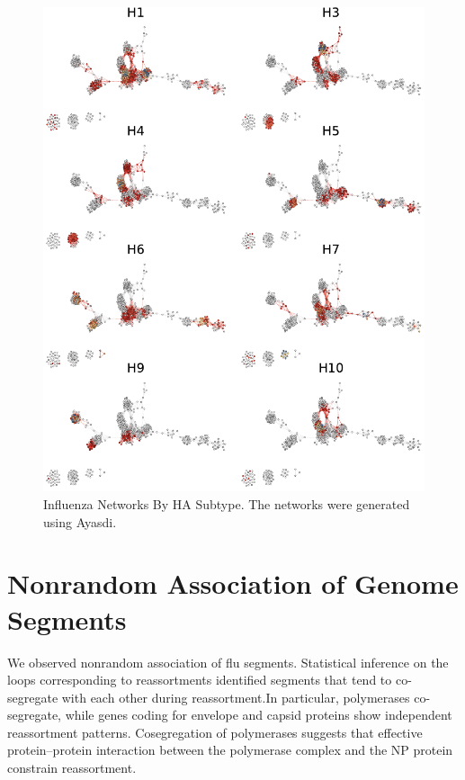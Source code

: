 \begin{figure}
\centering
\includegraphics[width=\textwidth]{fig/influenza/flu_networks_by_subtype.pdf}
\caption[Influenza Networks By HA Subtype]{Influenza Networks By HA Subtype. The networks were generated using Ayasdi. }
\label{fig:flu:networks_by_subtype}
\end{figure}

\section{Nonrandom Association of Genome Segments}
\label{flu:nonrandom_reassortment}

We observed nonrandom association of flu segments.
Statistical inference on the loops corresponding to reassortments identified segments that tend to co-segregate with each other during reassortment.In particular, polymerases co-segregate, while genes coding for envelope and capsid proteins show independent reassortment patterns.
Cosegregation of polymerases suggests that effective protein–protein interaction between the polymerase complex and the NP protein constrain reassortment. 


